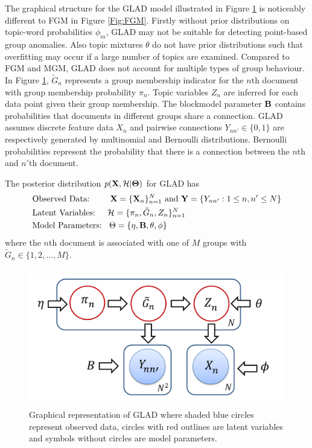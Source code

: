 The  graphical structure for the GLAD model illustrated in Figure \ref{Fig:GLAD} is noticeably different to FGM in Figure \ref{Fig:FGM}. Firstly without  prior distributions on topic-word probabilities $\phi_m$, GLAD may not be suitable for detecting point-based group anomalies. Also topic mixtures $\theta$ do not have prior distributions such that overfitting may occur if a large number of topics are examined. Compared to FGM and MGM, GLAD   does not account for multiple types of group behaviour. %
In Figure \ref{Fig:GLAD}, 
  ${\tilde G}_{n}$ represents a group membership indicator for the $n$th document with group membership  probability $\pi_n$. Topic variables $Z_n$ are inferred for each data point given their group membership.    The blockmodel parameter $\bf B$ contains  probabilities that documents in different groups share a connection. %
GLAD assumes discrete feature data  $ X_{n}$ and pairwise connections $Y_{n n'} \in \{0,1\}$  are respectively generated by  multinomial and Bernoulli distributions. Bernoulli probabilities represent the probability that there is a connection between the $n$th and $n'$th document. 

 The  posterior distribution %
$p({\bf X},\mathcal{H}| \boldsymbol\Theta) $ 
 for GLAD has %
 \begin{align*}
& \mbox{Observed Data:  \;\; \quad}  {\bf X}= \{{\bf X}_{n} \}_{n=1}^N \mbox{ and } {\bf Y} =\{Y_{nn'}: 1 \le n,n' \le N \} \\
 & \mbox{Latent Variables: \quad}    \mathcal{H}=\{\pi_{n},\tilde{G}_n, Z_{n} \}_{n=1}^N  \\
 & \mbox{Model Parameters: \;\,}  \Theta=\{\eta,{\bf B},\theta, \phi\}
 \end{align*} 
  where the $n$th document is associated with one of $M$ groups with $\tilde{  G}_{n}  \in \{1,2,\dots,M\}$. 
  


 
\begin{figure}[H]
\centering
\includegraphics[width=12cm, height= 6cm,trim=0cm 0.6cm 2.5cm 0cm]
{FIGURES/GLAD} 
\caption{Graphical representation of GLAD where shaded blue circles represent observed data, circles with red outlines are latent variables and symbols without circles are model parameters.}
\label{Fig:GLAD}
\end{figure}


